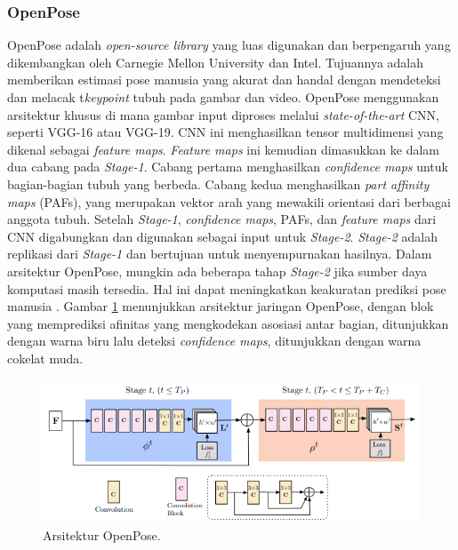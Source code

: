 \subsubsection{OpenPose}
\label{subsubsec:openpose}

OpenPose adalah \emph{open-source library} yang luas digunakan dan berpengaruh yang dikembangkan oleh Carnegie Mellon University dan Intel. Tujuannya adalah memberikan estimasi pose manusia yang akurat dan handal dengan mendeteksi dan melacak t\emph{keypoint} tubuh pada gambar dan video.
OpenPose menggunakan arsitektur khusus di mana gambar input diproses melalui \emph{state-of-the-art} CNN, seperti VGG-16 atau VGG-19. CNN ini menghasilkan tensor multidimensi yang dikenal sebagai \emph{feature maps}. \emph{Feature maps} ini kemudian dimasukkan ke dalam dua cabang pada \emph{Stage-1}.
Cabang pertama menghasilkan \emph{confidence maps} untuk bagian-bagian tubuh yang berbeda. Cabang kedua menghasilkan \emph{part affinity maps} (PAFs), yang merupakan vektor arah yang mewakili orientasi dari berbagai anggota tubuh.
Setelah \emph{Stage-1}, \emph{confidence maps}, PAFs, dan \emph{feature maps} dari CNN digabungkan dan digunakan sebagai input untuk \emph{Stage-2}. \emph{Stage-2} adalah replikasi dari \emph{Stage-1} dan bertujuan untuk menyempurnakan hasilnya. Dalam arsitektur OpenPose, mungkin ada beberapa tahap \emph{Stage-2} jika sumber daya komputasi masih tersedia. Hal ini dapat meningkatkan keakuratan prediksi pose manusia \parencite{cao2019}.
Gambar \ref{fig:openpose-architecture} menunjukkan arsitektur jaringan OpenPose, dengan blok yang memprediksi afinitas yang mengkodekan asosiasi antar bagian, ditunjukkan dengan warna biru lalu deteksi \emph{confidence maps}, ditunjukkan dengan warna cokelat muda.

\begin{figure}[ht]
  \centering
  \includegraphics[scale=1.1]{gambar/openpose_architecture.png}
  \caption{Arsitektur OpenPose.}
  \label{fig:openpose-architecture}
\end{figure}

